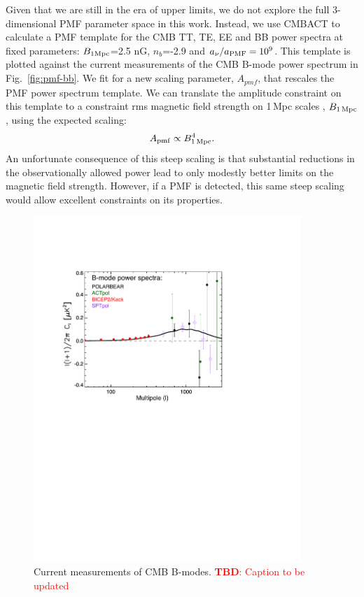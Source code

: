 \documentclass[preprint]{emulateapj}
\newcommand{\apmf}{\ensuremath{A_{\rm pmf}}}
\newcommand{\bpmf}{\ensuremath{B_{\rm 1\,Mpc}}}
\newcommand{\be}{\begin{equation}}
\newcommand{\ee}{\end{equation}}
\newcommand{\tbd}[1]{\textcolor{Red}{{\bf TBD}: #1}}
\begin{document}
Given that we are still in the era of upper limits,  we do not explore the full 3-dimensional PMF parameter space in this work. 
Instead, we use CMBACT to calculate a PMF template for the CMB TT, TE, EE and BB power spectra at fixed parameters: $B_{\rm{1Mpc}}$=2.5 \rm{nG}, $n_b$=-2.9 and $a_{\nu}/a_{\rm{PMF}}=10^9$. 
This template is plotted against the current measurements of the CMB B-mode power spectrum in Fig.~\ref{fig:pmf-bb}. 
We fit for a new scaling parameter, $A_{pmf}$, that rescales the PMF power spectrum template. 
We can translate the amplitude constraint on this template to a constraint rms magnetic field strength on 1\,Mpc scales , \bpmf, using the expected scaling:
\be
\apmf \propto \bpmf^4.
\ee
An unfortunate consequence of this steep scaling is that substantial reductions in the observationally allowed power lead to only modestly better limits on the magnetic field strength. 
However, if a PMF is detected, this same steep scaling would allow excellent constraints on its properties. 

\begin{figure}[htb]\centering
\includegraphics[width=0.9\textwidth,clip,trim={1.5cm 12.5cm 5cm 3.8cm}]{pmf_experiments.pdf}
  \caption[Current measurements of CMB B-modes]{
  Current measurements of CMB B-modes. \tbd{Caption to be updated}
      \label{fig:pmf-experiments}
  }
\end{figure}
\end{document}
